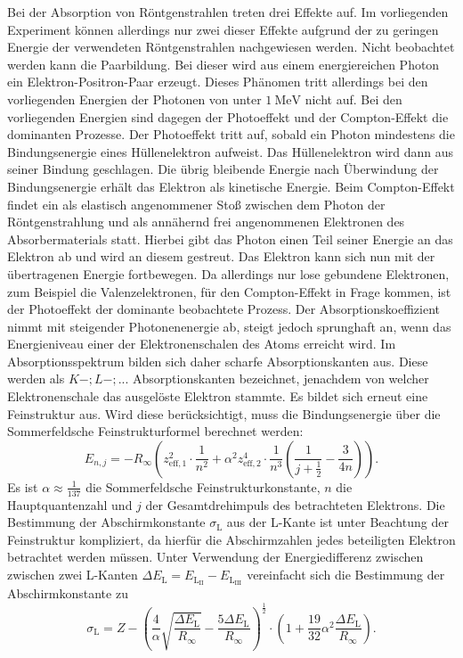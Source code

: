Bei der Absorption von Röntgenstrahlen treten drei Effekte auf. Im vorliegenden Experiment können allerdings nur zwei dieser Effekte aufgrund der zu geringen Energie der verwendeten Röntgenstrahlen nachgewiesen werden.
Nicht beobachtet werden kann die Paarbildung. Bei dieser wird aus einem energiereichen Photon ein Elektron-Positron-Paar erzeugt. Dieses Phänomen tritt allerdings bei den vorliegenden Energien der Photonen von unter $\SI{1}{\mega\electronvolt}$ nicht auf.
Bei den vorliegenden Energien sind dagegen der Photoeffekt und der Compton-Effekt die dominanten Prozesse.
Der Photoeffekt tritt auf, sobald ein Photon mindestens die Bindungsenergie eines Hüllenelektron aufweist.
Das Hüllenelektron wird dann aus seiner Bindung geschlagen. Die übrig bleibende Energie nach Überwindung der Bindungsenergie erhält das Elektron als kinetische Energie.
Beim Compton-Effekt findet ein als elastisch angenommener Stoß zwischen dem Photon der Röntgenstrahlung und als annähernd frei angenommenen Elektronen des Absorbermaterials statt.
Hierbei gibt das Photon einen Teil seiner Energie an das Elektron ab und wird an diesem gestreut.
Das Elektron kann sich nun mit der übertragenen Energie fortbewegen.
Da allerdings nur lose gebundene Elektronen, zum Beispiel die Valenzelektronen, für den Compton-Effekt in Frage kommen, ist der Photoeffekt der dominante beobachtete Prozess.
Der Absorptionskoeffizient nimmt mit steigender Photonenenergie ab, steigt jedoch sprunghaft an, wenn das Energieniveau einer der Elektronenschalen des Atoms erreicht wird.
Im Absorptionsspektrum bilden sich daher scharfe Absorptionskanten aus. Diese werden als $K-;L-;...$ Absorptionskanten bezeichnet, jenachdem von welcher Elektronenschale das ausgelöste Elektron stammte.
Es bildet sich erneut eine Feinstruktur aus. Wird diese berücksichtigt, muss die Bindungsenergie über die Sommerfeldsche Feinstrukturformel berechnet werden:
\begin{equation}
  E_{n,j}=-R_\infty  \left(z_\mathrm{eff,1}^2 \cdot \frac{1}{n^2}+\alpha^2 z_\mathrm{eff,2}^4 \cdot \frac{1}{n^3}\left(\frac{1}{j+\frac{1}{2}}-\frac{3}{4n}\right)\right)\text{.}
\end{equation}
Es ist $\alpha \approx \frac{1}{137}$ die Sommerfeldsche Feinstrukturkonstante, $n$ die Hauptquantenzahl und $j$ der Gesamtdrehimpuls des betrachteten Elektrons.
Die Bestimmung der Abschirmkonstante $\sigma_\mathrm{L}$ aus der L-Kante ist unter Beachtung der Feinstruktur kompliziert, da hierfür die Abschirmzahlen jedes beteiligten Elektron betrachtet werden müssen.
Unter Verwendung der Energiedifferenz zwischen zwischen zwei L-Kanten $\Delta E_\mathrm{L}=E_\mathrm{L_\mathrm{II}}-E_\mathrm{L_\mathrm{III}}$ vereinfacht sich die Bestimmung der Abschirmkonstante zu
\begin{equation}
  \sigma_{\mathrm{L}}=Z-\left(\frac{4}{\alpha}\sqrt{\frac{\Delta E_\mathrm{L}}{R_\infty}}-\frac{5\Delta E_\mathrm{L}}{R_\infty}\right)^{\frac{1}{2}}\cdot \left(1+\frac{19}{32}\alpha^2\frac{\Delta E_\mathrm{L}}{R_\infty}\right) \text{.}
\end{equation}

